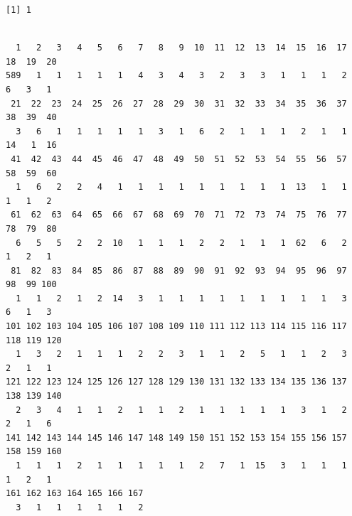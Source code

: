 \documentclass[
  letterpaper,
  DIV=11,
  numbers=noendperiod]{scrreprt}
\newenvironment{Shaded}{\begin{snugshade}}{\end{snugshade}}
\newcommand{\FunctionTok}[1]{\textcolor[rgb]{0.28,0.35,0.67}{#1}}
\newcommand{\NormalTok}[1]{\textcolor[rgb]{0.00,0.23,0.31}{#1}}
\newcommand{\OtherTok}[1]{\textcolor[rgb]{0.00,0.23,0.31}{#1}}
\newcommand{\SpecialCharTok}[1]{\textcolor[rgb]{0.37,0.37,0.37}{#1}}
\begin{document}
\begin{Shaded}
\end{Shaded}

\begin{verbatim}
[1] 1
\end{verbatim}

\begin{Shaded}
\end{Shaded}

\begin{verbatim}

  1   2   3   4   5   6   7   8   9  10  11  12  13  14  15  16  17  18  19  20 
589   1   1   1   1   1   4   3   4   3   2   3   3   1   1   1   2   6   3   1 
 21  22  23  24  25  26  27  28  29  30  31  32  33  34  35  36  37  38  39  40 
  3   6   1   1   1   1   1   3   1   6   2   1   1   1   2   1   1  14   1  16 
 41  42  43  44  45  46  47  48  49  50  51  52  53  54  55  56  57  58  59  60 
  1   6   2   2   4   1   1   1   1   1   1   1   1   1  13   1   1   1   1   2 
 61  62  63  64  65  66  67  68  69  70  71  72  73  74  75  76  77  78  79  80 
  6   5   5   2   2  10   1   1   1   2   2   1   1   1  62   6   2   1   2   1 
 81  82  83  84  85  86  87  88  89  90  91  92  93  94  95  96  97  98  99 100 
  1   1   2   1   2  14   3   1   1   1   1   1   1   1   1   1   3   6   1   3 
101 102 103 104 105 106 107 108 109 110 111 112 113 114 115 116 117 118 119 120 
  1   3   2   1   1   1   2   2   3   1   1   2   5   1   1   2   3   2   1   1 
121 122 123 124 125 126 127 128 129 130 131 132 133 134 135 136 137 138 139 140 
  2   3   4   1   1   2   1   1   2   1   1   1   1   1   3   1   2   2   1   6 
141 142 143 144 145 146 147 148 149 150 151 152 153 154 155 156 157 158 159 160 
  1   1   1   2   1   1   1   1   1   2   7   1  15   3   1   1   1   1   2   1 
161 162 163 164 165 166 167 
  3   1   1   1   1   1   2 
\end{verbatim}

\begin{Shaded}
\end{Shaded}
\end{document}
